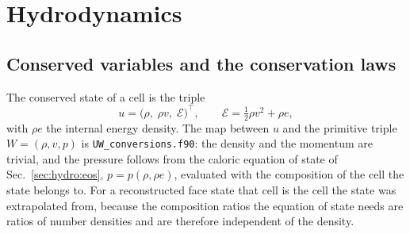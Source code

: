 \section{Hydrodynamics}
\label{sec:hydro}

\subsection{Conserved variables and the conservation laws}
\label{sec:hydro:euler}

The conserved state of a cell is the triple
%
\begin{equation}
  u = \bigl(\rho,\; \rho v,\; \mathcal{E}\bigr)^{\!\top},
  \qquad
  \mathcal{E} = \tfrac{1}{2}\rho v^2 + \rho e,
  \label{eq:cons}
\end{equation}
%
with $\rho e$ the internal energy density.  The map between $u$ and the
primitive triple $W = (\rho, v, p)$ is \texttt{UW\_conversions.f90}: the
density and the momentum are trivial, and the pressure follows from the
caloric equation of state of Sec.~\ref{sec:hydro:eos},
$p = p(\rho, \rho e)$, evaluated with the composition of the cell the state
belongs to.  For a reconstructed face state that cell is the cell the state
was extrapolated from, because the composition ratios the equation of state
needs are ratios of number densities and are therefore independent of the
density.

